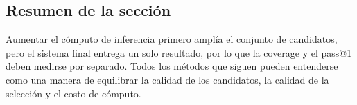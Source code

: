 \subsection{Resumen de la sección}

Aumentar el cómputo de inferencia primero amplía el conjunto de candidatos, pero el sistema final entrega un solo resultado, por lo que la coverage y el pass@1 deben medirse por separado. Todos los métodos que siguen pueden entenderse como una manera de equilibrar la calidad de los candidatos, la calidad de la selección y el costo de cómputo.

